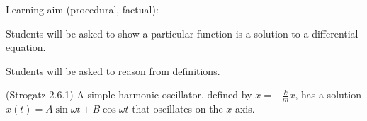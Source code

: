 \documentclass[12pt,letterpaper,noanswers]{exam}
\begin{document}
\begin{questions}

\question 
\begin{tcolorbox}
Learning aim (procedural, factual): 

Students will be asked to show a particular function is a solution to a differential equation.  

Students will be asked to reason from definitions.
\end{tcolorbox}

(Strogatz 2.6.1) A simple harmonic oscillator, defined by $\displaystyle\ddot{x} = -\frac{k}{m} x$, has a solution $x(t) = A\sin \omega t + B\cos \omega t$ that oscillates on the $x$-axis.

\end{questions}

 




\end{document}

